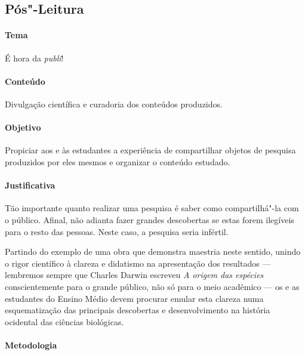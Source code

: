 \documentclass[11pt]{extarticle}
\begin{document}
\subsection{Pós"-Leitura}

\paragraph{Tema} É hora da \emph{publi}!

\paragraph{Conteúdo} Divulgação científica e curadoria dos conteúdos produzidos.

\paragraph{Objetivo} Propiciar aos e às estudantes a experiência de 
compartilhar objetos de pesquisa produzidos por eles mesmos e organizar
o conteúdo estudado.

\paragraph{Justificativa} Tão importante quanto realizar uma pesquisa é
saber como compartilhá"-la com o público. Afinal, não adianta fazer grandes
descobertas se estas forem ilegíveis para o resto das pessoas. Neste caso,
a pesquisa seria infértil.

Partindo do exemplo de uma obra que demonstra maestria neste sentido,
unindo o rigor científico à clareza e didatismo na apresentação
dos resultados --- lembremos sempre que Charles Darwin escreveu \textit{A origem das espécies}
conscientemente para o grande público, não só para o meio acadêmico --- 
os e as estudantes do Ensino Médio devem procurar emular esta clareza
numa esquematização das principais descobertas e desenvolvimento
na história ocidental das ciências biológicas.

\paragraph{Metodologia}
\end{document}
